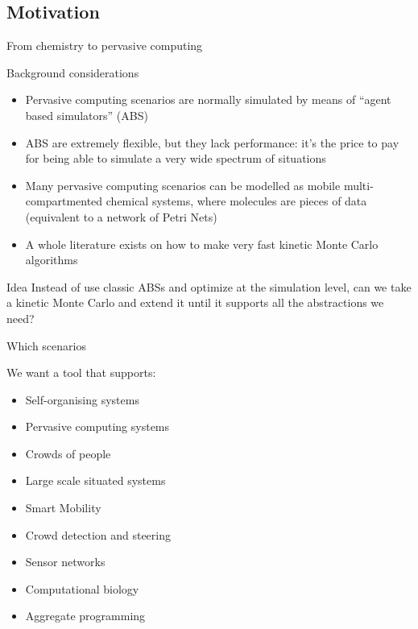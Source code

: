 \documentclass[presentation]{beamer}
\begin{document}
\subsection{Motivation}
\begin{frame}{From chemistry to pervasive computing}
 \begin{block}{Background considerations}
  \begin{itemize}
   \item Pervasive computing scenarios are normally simulated by means of ``agent based simulators'' (ABS) \cite{wooldridge-intelligentagents}
   \item ABS are extremely flexible, but they lack performance: it's the price to pay for being able to simulate a very wide spectrum of situations
   \item Many pervasive computing scenarios can be modelled as mobile multi-compartmented chemical systems, where molecules are pieces of data (equivalent to a network of Petri Nets)
   \item A whole literature exists on how to make very fast kinetic Monte Carlo algorithms
  \end{itemize}
 \end{block}
 \begin{block}{Idea}
  Instead of use classic ABSs and optimize at the simulation level, can we take a kinetic Monte Carlo and extend it until it supports all the abstractions we need?
 \end{block}
\end{frame}

\begin{frame}{Which scenarios}
 \begin{block}{We want a tool that supports:}
  \begin{itemize}
   \item Self-organising systems
   \item Pervasive computing systems
   \item Crowds of people
   \item Large scale situated systems
   \item Smart Mobility
   \item Crowd detection and steering
   \item Sensor networks
   \item Computational biology
   \item Aggregate programming
  \end{itemize}
 \end{block}
\end{frame}
\end{document}
